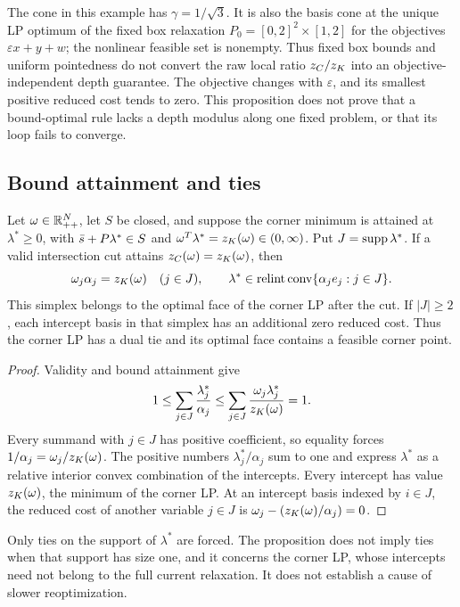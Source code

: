 The cone in this example has $\gamma=1/\sqrt3$. It is also the basis
cone at the unique LP optimum of the fixed box relaxation
$P_0=[0,2]^2\times[1,2]$ for the objectives
$\varepsilon x+y+w$; the nonlinear feasible set is nonempty. Thus fixed
box bounds and uniform pointedness do not convert the raw local ratio
$z_C/z_K$ into an objective-independent depth guarantee. The objective
changes with $\varepsilon$, and its smallest positive reduced cost tends
to zero. This proposition does not prove that a bound-optimal rule lacks
a depth modulus along one fixed problem, or that its loop fails to converge.

\subsection{Bound attainment and ties}

\begin{proposition}\label{cv:dual-ties}
Let $\omega\in\mathbb R_{++}^N$, let $S$ be closed, and suppose the corner minimum is
attained at $\lambda^*\ge0$, with
$\bar s+P\lambda^*\in S$ and
$\omega^T\lambda^*=z_K(\omega)\in(0,\infty)$. Put
$J=\operatorname{supp}\lambda^*$. If a valid intersection cut attains
$z_C(\omega)=z_K(\omega)$, then
\[
 \omega_j\alpha_j=z_K(\omega)\quad(j\in J),\qquad
 \lambda^*\in\operatorname{relint}\operatorname{conv}\{\alpha_je_j:j\in J\}.
\]
This simplex belongs to the optimal face of the corner LP after the cut.
If $|J|\ge2$, each intercept basis in that simplex has an additional
zero reduced cost. Thus the corner LP has a dual tie and its optimal face
contains a feasible corner point.
\end{proposition}

\begin{proof}
Validity and bound attainment give
\[
 1\le\sum_{j\in J}\frac{\lambda_j^*}{\alpha_j}
    \le\sum_{j\in J}\frac{\omega_j\lambda_j^*}{z_K(\omega)}=1.
\]
Every summand with $j\in J$ has positive coefficient, so equality forces
$1/\alpha_j=\omega_j/z_K(\omega)$. The positive numbers
$\lambda_j^*/\alpha_j$ sum to one and express $\lambda^*$ as a relative
interior convex combination of the intercepts. Every intercept has value
$z_K(\omega)$, the minimum of the corner LP. At an intercept basis indexed
by $i\in J$, the reduced cost of another variable $j\in J$ is
$\omega_j-(z_K(\omega)/\alpha_j)=0$.
\end{proof}

Only ties on the support of $\lambda^*$ are forced. The proposition does
not imply ties when that support has size one, and it concerns the corner
LP, whose intercepts need not belong to the full current relaxation. It
does not establish a cause of slower reoptimization.

